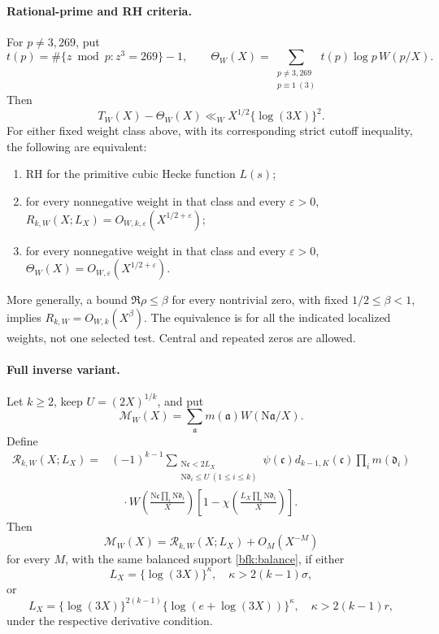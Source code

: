 \paragraph{Rational-prime and RH criteria.}
For \(p\ne3,269\), put
\[
 t(p)=\#\{z\bmod p:z^3=269\}-1,\qquad
 \Theta_W(X)=\sum_{\substack{p\ne3,269\\p\equiv1\ (3)}}
                t(p)\log p\,W(p/X).
\]
Then
\[
 T_W(X)-\Theta_W(X)\ll_W X^{1/2}\{\log(3X)\}^2.
\]
For either fixed weight class above, with its corresponding strict
cutoff inequality, the following are equivalent:
\begin{enumerate}
\item RH for the primitive cubic Hecke function \(L(s)\);
\item for every nonnegative weight in that class and every
\(\varepsilon>0\),
\(R_{k,W}(X;L_X)=O_{W,k,\varepsilon}(X^{1/2+\varepsilon})\);
\item for every nonnegative weight in that class and every
\(\varepsilon>0\),
\(\Theta_W(X)=O_{W,\varepsilon}(X^{1/2+\varepsilon})\).
\end{enumerate}
More generally, a bound \(\Re\rho\le\beta\) for every nontrivial
zero, with fixed \(1/2\le\beta<1\), implies
\(R_{k,W}=O_{W,k}(X^\beta)\).
The equivalence is for all the indicated localized weights, not one
selected test.  Central and repeated zeros are allowed.

\paragraph{Full inverse variant.}
Let \(k\ge2\), keep \(U=(2X)^{1/k}\), and put
\[
 \mathcal M_W(X)=\sum_{\mathfrak a}m(\mathfrak a)
                                      W(\mathrm N\mathfrak a/X).
\]
Define
\begin{equation}
\begin{split}
 \mathcal R_{k,W}(X;L_X)
 ={}&(-1)^{k-1}
 \sum_{\substack{\mathrm N\mathfrak c<2L_X\\
                 \mathrm N\mathfrak d_i\le U\ (1\le i\le k)}}
 \psi(\mathfrak c)d_{k-1,K}(\mathfrak c)
                   \prod_i m(\mathfrak d_i)\\
 &\quad{}\cdot
 W\left(\frac{\mathrm N\mathfrak c
                   \prod_i\mathrm N\mathfrak d_i}{X}\right)
 \left[1-\chi\left(\frac{L_X\prod_i\mathrm N\mathfrak d_i}{X}\right)\right].
\end{split}
\label{bfk:inverse-remainder}
\end{equation}
Then
\begin{equation}
 \mathcal M_W(X)=\mathcal R_{k,W}(X;L_X)+O_M(X^{-M})
 \label{bfk:inverse-main}
\end{equation}
for every \(M\), with the same balanced support
\eqref{bfk:balance}, if either
\[
 L_X=\{\log(3X)\}^{\kappa},\quad \kappa>2(k-1)\sigma,
\]
or
\[
 L_X=\{\log(3X)\}^{2(k-1)}
       \{\log(e+\log(3X))\}^{\kappa},
 \quad\kappa>2(k-1)r,
\]
under the respective derivative condition.



